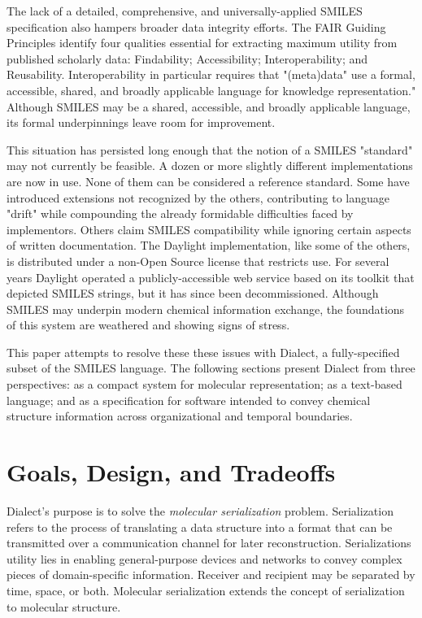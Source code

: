 \documentclass{article}
\begin{document}
The lack of a detailed, comprehensive, and universally-applied SMILES specification also hampers broader data integrity efforts. The FAIR Guiding Principles\cite{wilkinson:2016} identify four qualities essential for extracting maximum utility from published scholarly data: Findability; Accessibility; Interoperability; and Reusability. Interoperability in particular requires that "(meta)data" use a formal, accessible, shared, and broadly applicable language for knowledge representation." Although SMILES may be a shared, accessible, and broadly applicable language, its formal underpinnings leave room for improvement.

This situation has persisted long enough that the notion of a SMILES "standard" may not currently be feasible. A dozen or more slightly different implementations are now in use. None of them can be considered a reference standard. Some have introduced extensions not recognized by the others, contributing to language "drift" while compounding the already formidable difficulties faced by implementors. Others claim SMILES compatibility while ignoring certain aspects of written documentation. The Daylight implementation, like some of the others, is distributed under a non-Open Source license that restricts use.\cite{daylightToolkit} For several years Daylight operated a publicly-accessible web service based on its toolkit that depicted SMILES strings, but it has since been decommissioned.\cite{depictArchive} Although SMILES may underpin modern chemical information exchange, the foundations of this system are weathered and showing signs of stress.

This paper attempts to resolve these these issues with Dialect, a fully-specified subset of the SMILES language. The following sections present Dialect from three perspectives: as a compact system for molecular representation; as a text-based language; and as a specification for software intended to convey chemical structure information across organizational and temporal boundaries.

\section*{Goals, Design, and Tradeoffs}

Dialect's purpose is to solve the \textit{molecular serialization} problem. Serialization refers to the process of translating a data structure into a format that can be transmitted over a communication channel for later reconstruction. Serializations utility lies in enabling general-purpose devices and networks to convey complex pieces of domain-specific information. Receiver and recipient may be separated by time, space, or both. Molecular serialization extends the concept of serialization to molecular structure.
\end{document}
